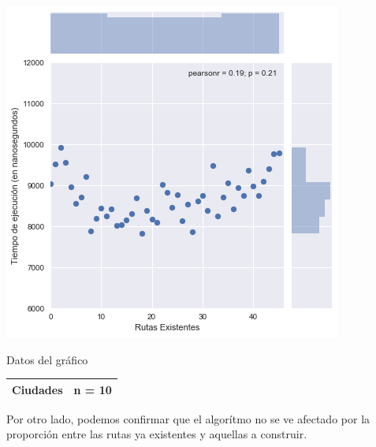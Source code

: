 \noindent
\begin{minipage}{0.55\textwidth}
	\hfill
	\includegraphics[scale=0.60]{imagenes/ej3-2.png}
\end{minipage}
\hfill
\begin{minipage}{0.44\textwidth}
	\begin{center}
		Datos del gráfico

		\begin{tabular}{ | l l |}
			\hline
			Ciudades & n = 10 \\
			\hline
		\end{tabular}
	\end{center}
\end{minipage}

Por otro lado, podemos confirmar que el algorítmo no se ve afectado por la proporción entre las rutas ya existentes y aquellas a construir.